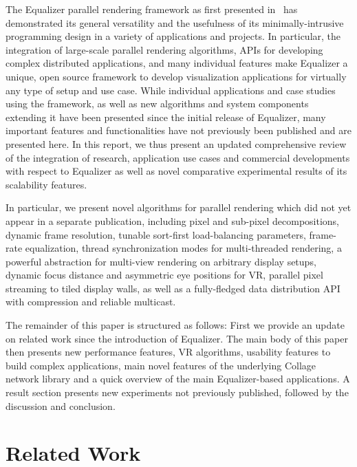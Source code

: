 \documentclass[10pt,journal,compsoc]{IEEEtran}
\begin{document}
The Equalizer parallel rendering framework as first presented in~\cite{EMP:09} has
demonstrated its general versatility and the usefulness of its minimally-intrusive
programming design in a variety of applications and projects.
In particular, the integration of large-scale parallel rendering algorithms,
APIs for developing complex distributed applications, and many
individual features make Equalizer a unique, open source framework to develop
visualization applications for virtually any type of setup and use case.
While individual applications and case studies using the framework, as well as
new algorithms and system components extending it have been presented
since the initial release of Equalizer, many important features and functionalities
have not previously been published and are presented here.
In this report, we thus present an updated comprehensive review of the
integration of research, application use cases and commercial developments
with respect to Equalizer as well as novel comparative experimental results
of its scalability features.

In particular, we present novel algorithms for parallel rendering which did not yet
appear in a separate publication, including pixel and sub-pixel decompositions,
dynamic frame resolution, tunable sort-first load-balancing parameters, frame-rate
equalization, thread synchronization modes for multi-threaded rendering, a
powerful abstraction for multi-view rendering on arbitrary display setups,
dynamic focus distance and asymmetric eye positions for VR,
parallel pixel streaming to tiled display walls, as well as a fully-fledged data
distribution API with compression and reliable multicast.

The remainder of this paper is structured as follows: First we provide an update
on related work since the introduction of \textsf{Equalizer}. The main body of this paper
then presents new performance features, VR algorithms, usability
features to build complex applications, main novel features of the underlying
\textsf{Collage} network library and a quick overview of the main
\textsf{Equalizer}-based applications. A result section presents new experiments
not previously published, followed by the discussion and conclusion.

\section{Related Work}\label{sec:related}
\end{document}
